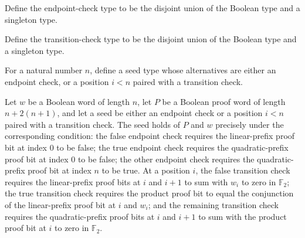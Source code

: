 \begin{definition}
\label{FABL.CompleteQuadraticEndpointCheck}
\leanok
Define the endpoint-check type to be the disjoint union of the Boolean type and a
singleton type.
\end{definition}

\begin{definition}
\label{FABL.CompleteQuadraticTransitionCheck}
\leanok
Define the transition-check type to be the disjoint union of the Boolean type and a
singleton type.
\end{definition}

\begin{definition}
\label{FABL.CompleteQuadraticLinearCheckSeed}
\leanok
{}
For a natural number $n$, define a seed type whose alternatives are either an endpoint
check, or a position $i<n$ paired with a transition check.
\end{definition}

\begin{definition}
\label{FABL.CompleteQuadraticLinearCheckHolds}
\leanok
{}
Let $w$ be a Boolean word of length $n$, let $P$ be a Boolean proof word of length
$n+2(n+1)$, and let a seed be either an endpoint check or a position $i<n$ paired with a
transition check. The seed holds of $P$ and $w$ precisely under the corresponding
condition: the false endpoint check requires the linear-prefix proof bit at index $0$ to
be false; the true endpoint check requires the quadratic-prefix proof bit at index $0$
to be false; the other endpoint check requires the quadratic-prefix proof bit at index
$n$ to be true. At a position $i$, the false transition check requires the linear-prefix
proof bits at $i$ and $i+1$ to sum with $w_i$ to zero in $\mathbb F_2$; the true
transition check requires the product proof bit to equal the conjunction of the
linear-prefix proof bit at $i$ and $w_i$; and the remaining transition check requires
the quadratic-prefix proof bits at $i$ and $i+1$ to sum with the product proof bit at
$i$ to zero in $\mathbb F_2$.
\end{definition}

